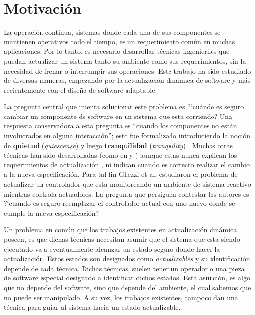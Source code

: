 \section{Motivación}

La operación continua, sistemas donde cada una de sus componentes se mantienen operativos todo el tiempo, es un
requerimiento común en muchas aplicaciones. Por lo tanto, es necesario desarrollar técnicas ingenieriles que puedan
actualizar un sistema tanto su ambiente como sus requerimientos, sin la necesidad de frenar o interrumpir sus
operaciones. Este trabajo ha sido estudiado de diversas maneras, empezando por la actualización dinámica de software
\cite{60317} y más recientemente con el diseño de software adaptable. \cite{SEAMS}

La pregunta central que intenta solucionar este problema es ?`cuándo es seguro cambiar un componente de software en un sistema
que esta corriendo? Una respuesta conservadora a esta pregunta es ``cuando los componentes no están involucrados en
alguna interacción''; esto fue formalizado introduciendo la noción de \textbf{quietud} (\emph{quiescense}) \cite{60317} y luego
\textbf{tranquilidad} (\emph{tranquility}) \cite{4359466}. Muchas otras técnicas han sido desarrolladas (como en
\cite{Anderson:2009:MPM:1656437.1656448} y \cite{485222}) aunque estas nunca explican los requerimientos de
actualización \cite{Baresi:2010:DBD:1882362.1882367}, ni indican cuando es correcto realizar el cambio a la nueva especificación.
Para tal fin Ghezzi et al. \cite{6224401,PanzicaLaManna:2013:FCC:2487336.2487349} estudiaron el problema de actualizar un
controlador que esta monitoreando un ambiente de sistema reactivo mientras controla actuadores. La pregunta que persiguen
contestar los autores es ?`cuándo es seguro reemplazar el controlador actual con uno nuevo donde se cumple la nueva
especificación?

Un problema en común que los trabajos existentes en actualización dinámica poseen, es que dichas técnicas necesitan
asumir que el sistema que esta siendo ejecutado va a eventualmente alcanzar un estado seguro donde hacer la
actualización. Estos estados son designados como \emph{actualizables} y su identificación depende de cada técnica.
Dichas técnicas, suelen tener un operador o una pieza de software especial designado a identificar dichos estados. Esta asunción, es algo
que no depende del software, sino que depende del ambiente, el cual sabemos que no puede ser manipulado. A su vez, los trabajos
existentes, tampoco dan una técnica para guiar al sistema hacia un estado actualizable. 

